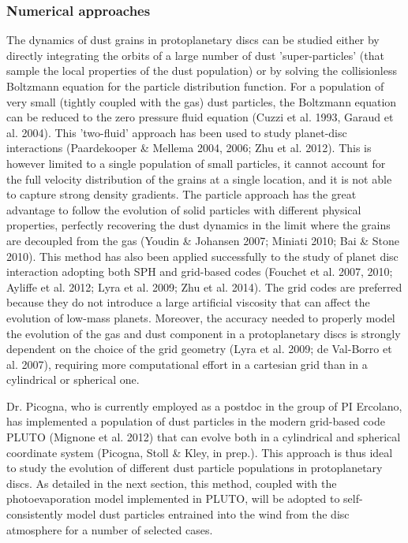 \documentclass[10pt,fleqn,twoside]{article}
\begin{document}
\subsubsection{Numerical approaches}

The dynamics of dust grains in protoplanetary discs can be studied
either by directly integrating the orbits of a large number of dust
'super-particles' (that sample the local properties of the dust
population) or by solving the collisionless Boltzmann equation for the
particle distribution function. For a population of very small
(tightly coupled with the gas) dust particles, the Boltzmann equation
can be reduced to the zero pressure fluid equation (Cuzzi et al. 1993,
Garaud et al. 2004). This 'two-fluid' approach has been used to study
planet-disc interactions (Paardekooper \& Mellema 2004, 2006; Zhu et
al. 2012). This is however limited to a single population of
small particles, it cannot account for the full velocity distribution
of the grains at a single location, and it is not able to capture
strong density gradients. The particle approach has the great
advantage to follow the evolution of solid particles with different
physical properties, perfectly recovering the dust dynamics in the
limit where the grains are decoupled from the gas (Youdin \& Johansen
2007; Miniati 2010; Bai \& Stone 2010). This method has also been
applied successfully to the study of planet disc interaction adopting
both SPH and grid-based codes (Fouchet et al. 2007, 2010; Ayliffe et
al. 2012; Lyra et al. 2009; Zhu et al. 2014). The grid codes are
preferred because they do not introduce a large artificial viscosity
that can affect the evolution of low-mass planets. Moreover, the
accuracy needed to properly model the evolution of the gas and dust
component in a protoplanetary discs is strongly dependent on the
choice of the grid geometry (Lyra et al. 2009; de Val-Borro et
al. 2007), requiring more computational effort in a cartesian grid
than in a cylindrical or spherical one. 

Dr. Picogna, who is currently employed as a postdoc in the group of PI
Ercolano, has implemented a population of dust
particles in the modern grid-based code PLUTO (Mignone et al. 2012)
that can evolve both in a cylindrical and spherical coordinate system
(Picogna, Stoll \& Kley, in prep.). This approach is thus ideal to
study the evolution of different dust particle populations in
protoplanetary discs. As detailed in the next section, this method,
coupled with the photoevaporation model implemented in PLUTO, will be
adopted to self-consistently model dust particles entrained into the
wind from the disc atmosphere for a number of selected cases.
\end{document}
